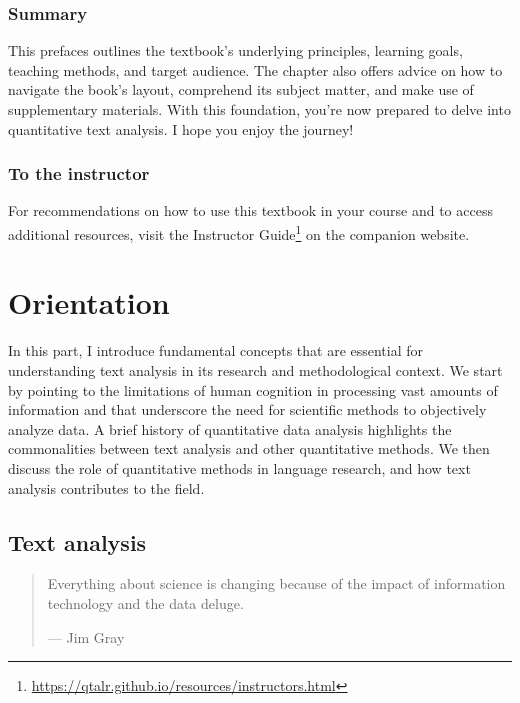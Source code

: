 \documentclass[
  letterpaper,
]{latex/krantz}
\theoremstyle{definition}
\theoremstyle{remark}
\DeclareRobustCommand{\href}[2]{#2\footnote{\url{#1}}}
\begin{document}
\section*{Summary}\label{sec-p-summary}


This prefaces outlines the textbook's underlying principles, learning
goals, teaching methods, and target audience. The chapter also offers
advice on how to navigate the book's layout, comprehend its subject
matter, and make use of supplementary materials. With this foundation,
you're now prepared to delve into quantitative text analysis. I hope you
enjoy the journey!

\section*{To the instructor}\label{sec-p-instructor}


For recommendations on how to use this textbook in your course and to
access additional resources, visit the
\href{https://qtalr.github.io/resources/instructors.html}{Instructor
Guide} on the companion website.

\part{Orientation}

In this part, I introduce fundamental concepts that are essential for
understanding text analysis in its research and methodological context.
We start by pointing to the limitations of human cognition in processing
vast amounts of information and that underscore the need for scientific
methods to objectively analyze data. A brief history of quantitative
data analysis highlights the commonalities between text analysis and
other quantitative methods. We then discuss the role of quantitative
methods in language research, and how text analysis contributes to the
field.

\chapter{Text analysis}\label{sec-text-chapter}

\begin{quote}
Everything about science is changing because of the impact of
information technology and the data deluge.

--- Jim Gray
\end{quote}
\end{document}
